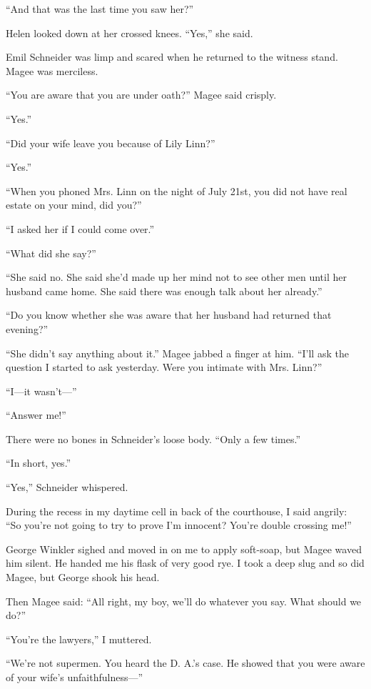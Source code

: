 \documentclass{novel}
\begin{document}
“And that was the last time you saw her?”

Helen looked down at her crossed knees. “Yes,” she said.

\scenestars

Emil Schneider was limp and scared when he returned to the witness stand. Magee was merciless.

“You are aware that you are under oath?” Magee said crisply.

“Yes.”

“Did your wife leave you because of Lily Linn?”

“Yes.”

“When you phoned Mrs. Linn on the night of July 21st, you did not have real estate on your mind, did you?”

“I asked her if I could come over.”

“What did she say?”

“She said no. She said she’d made up her mind not to see other men until her husband came home. She said there was enough talk about her already.”

“Do you know whether she was aware that her husband had returned that evening?”

“She didn’t say anything about it.” Magee jabbed a \mbox{finger} at him. “I’ll ask the question I started to ask yesterday. Were you intimate with Mrs. Linn?”

“I—it wasn’t—”

“Answer me!”

There were no bones in Schneider’s loose body. “Only a few times.”

“In short, yes.”

“Yes,” Schneider whispered.

\scenestars

During the recess in my daytime cell in back of the courthouse, I said angrily: “So you’re not going to try to prove I’m innocent? You’re double crossing me!”

George Winkler sighed and moved in on me to apply soft-soap, but Magee waved him silent. He handed me his flask of very good rye. I took a deep slug and so did Magee, but George shook his head.

Then Magee said: “All right, my boy, we’ll do whatever you say. What should we do?”

“You’re the lawyers,” I muttered.

“We’re not supermen. You heard the D. A.’s case. He showed that you were aware of your wife’s unfaithfulness—”
\end{document}
